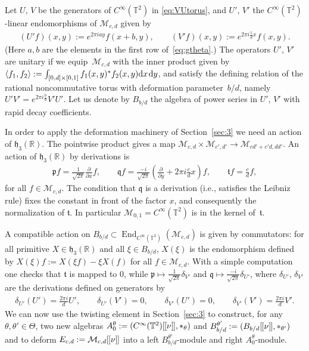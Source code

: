 \documentclass[10pt,a4paper]{amsart}
\numberwithin{equation}{section}
\theoremstyle{definition}
\newcommand{\R}{\mathbb{R}}
\newcommand{\T}{\mathbb{T}}
\newcommand{\mf}{\mathfrak}
\newcommand{\inner}[1]{\left<\smash[t]{#1}\right>}
\newcommand{\de}{\mathrm{d}}
\newcommand{\lbrak}{[\hspace{-0.5pt}[}
\newcommand{\rbrak}{]\hspace{-0.5pt}]}
\newcommand{\ga}{\mf{p}}
\newcommand{\gb}{\mf{q}}
\newcommand{\gc}{\mf{t}}
\begin{document}
Let $U$, $V$ be the generators of $C^\infty(\T^2)$ in \eqref{eq:VUtorus}, and $U'$, $V'$ the
$C^\infty(\T^2)$-linear endomorphisms of $\mathcal{M}_{c,d}$ given by
\begin{gather*}
(U'f)(x,y):=e^{2\pi iay}f(x+b,y) ,\qquad
(V'f)(x,y):=e^{2\pi i\frac{1}{d}x}f(x,y) .
\end{gather*}
(Here $a,b$ are the elements in the f\/irst row of~\eqref{eq:gtheta}.)
The operators $U'$, $V'$ are unitary if we equip~$\mathcal{M}_{c,d}$ with the inner product given by~$\inner{f_1,f_2}:=\int_{[0,d]\times [0,1]}f_1(x,y)^*f_2(x,y)\de x\hspace{1pt}\de y$,
and satisfy the def\/ining relation of the rational noncommutative torus with deformation parame\-ter~$b/d$, namely $U'V'=e^{2\pi i\frac{b}{d}}V'U'$.
Let us denote by $B_{b/d}$ the algebra of power series in $U'$, $V'$ with rapid decay coef\/f\/icients.

In order to apply the deformation machinery of Section~\ref{sec:3} we need an action of $\mf{h}_3(\R)$.
The pointwise product gives a map $\mathcal{M}_{c,d}\times\mathcal{M}_{c',d'}\to\mathcal{M}_{cd'+c'd,dd'}$. An action of $\mf{h}_3(\R)$ by derivations is
\begin{gather*}
\ga f=\frac{1}{\sqrt{2\pi}}\frac{\partial}{\partial x}f
,\qquad
\gb f=\frac{-i}{\sqrt{2\pi}}\left(\frac{\partial}{\partial y}+2\pi i\frac{c}{d}x\right)f
,\qquad
\gc f=\frac{c}{d}f
,
\end{gather*}
for all $f\in\mathcal{M}_{c,d}$.
The condition that $\gb$ is a derivation (i.e., satisf\/ies the Leibniz rule) f\/ixes the constant in front of the factor $x$, and consequently the normalization of $\gc$.
In particular $\mathcal{M}_{0,1}=C^\infty(\T^2)$ is in the kernel of~$\gc$.

A compatible action on $B_{b/d}\subset\operatorname{End}_{C^\infty(\T^2)}(\mathcal{M}_{c,d})$ is given by commutators: for all primitive $X\in\mf{h}_3(\R)$ and all $\xi\in B_{b/d}$, $X(\xi)$ is the endomorphism def\/ined by
$X(\xi)f :=X(\xi f)-\xi X(f)$ for all $f\in\mathcal{M}_{c,d}$.
With a simple computation one checks that $\gc$ is mapped to $0$, while $\ga\mapsto\frac{1}{\sqrt{2\pi}}\delta_{V'}$ and $\gb\mapsto\frac{-i}{\sqrt{2\pi}}\delta_{U'}$, where $\delta_{U'}$, $\delta_{V'}$ are the derivations def\/ined on generators by
\begin{gather*}
\delta_{U'}(U')=\tfrac{2\pi i}{d} U' ,\qquad
\delta_{U'}(V')=0 ,\qquad
\delta_{V'}(U')=0 ,\qquad
\delta_{V'}(V')=\tfrac{2\pi i}{d} V' .
\end{gather*}
We can now use the twisting element in Section~\ref{sec:3} to construct,
for any $\theta,\theta'\in\Theta$,
two new algebras $A_0^\theta:=(C^\infty(\T^2)\lbrak\nu\rbrak,\ast_\theta)$
and
$B_{b/d}^{\theta'}:=(B_{b/d}\lbrak\nu\rbrak,\ast_{\theta'})$
and to deform
$E_{c,d}:=\mathcal{M}_{c,d}\lbrak\nu\rbrak$ into a left
$B_{b/d}^{\theta'}$-module and right $A_0^\theta$-module.
\end{document}

